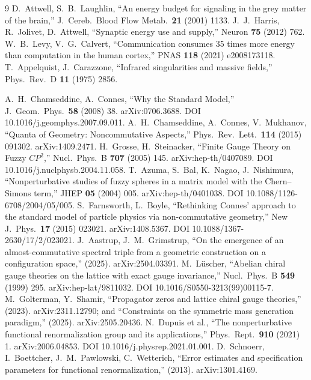 \begin{thebibliography}{9}
D.~Attwell, S.~B.~Laughlin, ``An energy budget for signaling in the grey matter of the brain,'' J.\ Cereb.\ Blood Flow Metab.\ \textbf{21} (2001) 1133.
J.~J.~Harris, R.~Jolivet, D.~Attwell, ``Synaptic energy use and supply,'' Neuron \textbf{75} (2012) 762.
W.~B.~Levy, V.~G.~Calvert, ``Communication consumes 35 times more energy than computation in the human cortex,'' PNAS \textbf{118} (2021) e2008173118.
T.~Appelquist, J.~Carazzone, ``Infrared singularities and massive fields,'' Phys.\ Rev.\ D \textbf{11} (1975) 2856.

A.~H.~Chamseddine, A.~Connes, ``Why the Standard Model,'' J.\ Geom.\ Phys.\ \textbf{58} (2008) 38. arXiv:0706.3688. DOI 10.1016/j.geomphys.2007.09.011.
A.~H.~Chamseddine, A.~Connes, V.~Mukhanov, ``Quanta of Geometry: Noncommutative Aspects,'' Phys.\ Rev.\ Lett.\ \textbf{114} (2015) 091302. arXiv:1409.2471.
H.~Grosse, H.~Steinacker, ``Finite Gauge Theory on Fuzzy $CP^2$,'' Nucl.\ Phys.\ B \textbf{707} (2005) 145. arXiv:hep-th/0407089. DOI 10.1016/j.nuclphysb.2004.11.058.
T.~Azuma, S.~Bal, K.~Nagao, J.~Nishimura, ``Nonperturbative studies of fuzzy spheres in a matrix model with the Chern--Simons term,'' JHEP \textbf{05} (2004) 005. arXiv:hep-th/0401038. DOI 10.1088/1126-6708/2004/05/005.
S.~Farnsworth, L.~Boyle, ``Rethinking Connes' approach to the standard model of particle physics via non-commutative geometry,'' New J.\ Phys.\ \textbf{17} (2015) 023021. arXiv:1408.5367. DOI 10.1088/1367-2630/17/2/023021.
J.~Aastrup, J.~M.~Grimstrup, ``On the emergence of an almost-commutative spectral triple from a geometric construction on a configuration space,'' (2025). arXiv:2504.03391.
M.~L\"uscher, ``Abelian chiral gauge theories on the lattice with exact gauge invariance,'' Nucl.\ Phys.\ B \textbf{549} (1999) 295. arXiv:hep-lat/9811032. DOI 10.1016/S0550-3213(99)00115-7.
M.~Golterman, Y.~Shamir, ``Propagator zeros and lattice chiral gauge theories,'' (2023). arXiv:2311.12790; and ``Constraints on the symmetric mass generation paradigm,'' (2025). arXiv:2505.20436.
N.~Dupuis et al., ``The nonperturbative functional renormalization group and its applications,'' Phys.\ Rept.\ \textbf{910} (2021) 1. arXiv:2006.04853. DOI 10.1016/j.physrep.2021.01.001.
D.~Schnoerr, I.~Boettcher, J.~M.~Pawlowski, C.~Wetterich, ``Error estimates and specification parameters for functional renormalization,'' (2013). arXiv:1301.4169.


\end{thebibliography}
